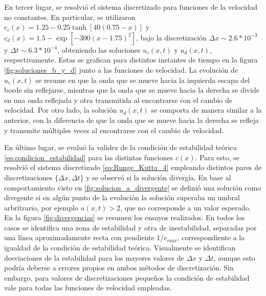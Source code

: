 \documentclass[aps,prb,twocolumn,superscriptaddress,floatfix,longbibliography,10pt]{revtex4-2}
\newcounter{para}
\begin{document}
En tercer lugar, se resolvió el sistema discretizado para funciones de la velocidad no constantes. En particular, se utilizaron $c_c(x) = 1.25 -0.25 \tanh{[40(0.75-x)]}$ y $c_d(x) = 1.5 - \exp{[-300(x-1.75)^2]}$, bajo la discretización $\Delta x \sim 2.6*10^{-3}$ y  $\Delta t \sim 6.3*10^{-4}$, obteniendo las soluciones $u_c(x,t)$ y $u_d(x,t)$, respectivamente. Estas se grafican para distintos instantes de tiempo en la figura \ref{fig:soluciones_b_y_d} junto a las funciones de velocidad. La evolución de $u_c(x,t)$ se resume en que la onda que se mueve hacia la izquierda escapa del borde sin reflejarse, mientras que la onda que se mueve hacia la derecha se divide en una onda reflejada y otra transmitida al encontrarse con el cambio de velocidad. Por otro lado, la solución $u_d(x,t)$ se comporta de manera similar a la anterior, con la diferencia de que la onda que se mueve hacia la derecha se refleja y transmite múltiples veces al encontrarse con el cambio de velocidad.

En último lugar, se evaluó la validez de la condición de estabilidad teórica \ref{eq:condicion_estabilidad} para las distintas funciones $c(x)$. Para esto, se resolvió el sistema discretizado \ref{eq:Runge_Kutta_4} empleando distintos pares de discretizaciones $\{ \Delta x, \Delta t \}$ y se observó si la solución divergía. En base al comportamiento visto en \ref{fig:solucion_a_divergente} se definió una solución como divegente si en algún punto de la evolución la solución superaba un umbral arbritrario, por ejemplo $u(x,t) > 2$, que no corresponde a un valor esperado. En la figura \ref{fig:divergencias} se resumen los ensayos realizados. En todos los casos se identifica una zona de estabilidad y otra de inestabilidad, separadas por una línea aproximadamente recta con pendiente $1/c_{max}$, correspondiente a la igualdad de la condición de estabilidad teórica. Visualmente se identifican desviaciones de la estabilidad para los mayores valores de $\Delta x$ y $\Delta t$, aunque esto podría deberse a errores propios en ambos métodos de discretización. Sin embargo, para valores de discretizaciones pequeños la condición de estabilidad vale para todas las funciones de velocidad empleadas.


\onecolumngrid
\end{document}

